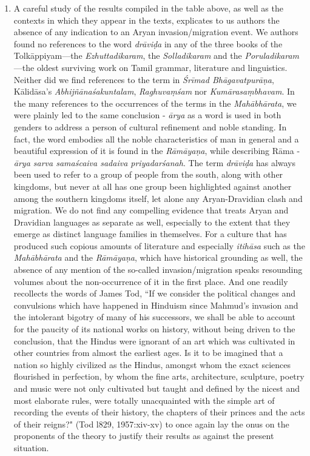 \begin{enumerate}
\item A careful study of the results compiled in the table above, as well as the contexts in which they appear in the texts, explicates to us authors the absence of any indication to an Aryan invasion/migration event. We authors found no references to the word \textit{drāviḍa} in any of the three books of the Tolkāppiyam—the \textit{Ezhuttadikaram}, the \textit{Solladikaram} and the \textit{Poruladikaram}—the oldest surviving work on Tamil grammar, literature and linguistics. Neither did we find references to the term in \textit{Śrīmad Bhāgavatpurāṇa}, Kālidāsa’s \textit{Abhijñānaśakuntalam}, \textit{Raghuvaṃśam} nor \textit{Kumārasaṃbhavam}. In the many references to the occurrences of the terms in the \textit{Mahābhārata}, we were plainly led to the same conclusion - \textit{ārya} as a word is used in both genders to address a person of cultural refinement and noble standing. In fact, the word embodies all the noble characteristics of man in general and a beautiful expression of it is found in the \textit{Rāmāyaṇa}, while describing Rāma -\textit{ ārya sarva samaścaiva sadaiva priyadarśanah}. The term \textit{drāviḍa} has always been used to refer to a group of people from the south, along with other kingdoms, but never at all has one group been highlighted against another among the southern kingdoms itself, let alone any Aryan-Dravidian clash and migration. We do not find any compelling evidence that treats Aryan and Dravidian languages as separate as well, especially to the extent that they emerge as distinct language families in themselves. For a culture that has produced such copious amounts of literature and especially \textit{itihāsa} such as the \textit{Mahābhārata} and the \textit{Rāmāyaṇa}, which have historical grounding as well, the absence of any mention of the so-called invasion/migration speaks resounding volumes about the non-occurrence of it in the first place. And one readily recollects the words of James Tod, “If we consider the political changes and convulsions which have happened in Hinduism since Mahmud's invasion and the intolerant bigotry of many of his successors, we shall be able to account for the paucity of its national works on history, without being driven to the conclusion, that the Hindus were ignorant of an art which was cultivated in other countries from almost the earliest ages. Is it to be imagined that a nation so highly civilized as the Hindus, amongst whom the exact sciences flourished in perfection, by whom the fine arts, architecture, sculpture, poetry and music were not only cultivated but taught and defined by the nicest and most elaborate rules, were totally unacquainted with the simple art of recording the events of their history, the chapters of their princes and the acts of their reigns?" (Tod l829, 1957:xiv-xv) to once again lay the onus on the proponents of the theory to justify their results as against the present situation. 


\end{enumerate}
